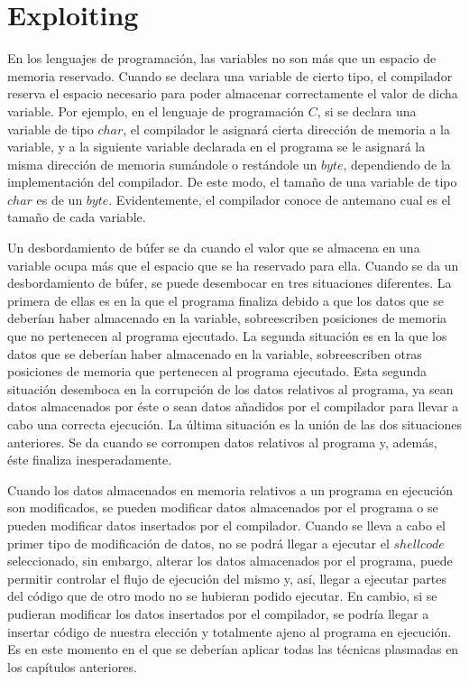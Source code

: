 \documentclass [titlepage, 12pt]{article}
\begin{document}
\pagebreak

\section{Exploiting}

En los lenguajes de programaci\'on, las variables no son m\'as que un espacio de memoria reservado. Cuando se declara una variable de cierto tipo, el compilador reserva el espacio necesario para poder almacenar correctamente el valor de dicha variable. Por ejemplo, en el lenguaje de programaci\'on $C$, si se declara una variable de tipo $char$, el compilador le asignar\'a cierta direcci\'on de memoria a la variable, y a la siguiente variable declarada en el programa se le asignar\'a la misma direcci\'on de memoria sum\'andole o rest\'andole un $byte$, dependiendo de la implementaci\'on del compilador. De este modo, el tama\~no de una variable de tipo $char$ es de un $byte$. Evidentemente, el compilador conoce de antemano cual es el tama\~no de cada variable.\bigskip

Un desbordamiento de b\'ufer se da cuando el valor que se almacena en una variable ocupa m\'as que el espacio que se ha reservado para ella. Cuando se da un desbordamiento de b\'ufer, se puede desembocar en tres situaciones diferentes. La primera de ellas es en la que el programa finaliza debido a que los datos que se deber\'ian haber almacenado en la variable, sobreescriben posiciones de memoria que no pertenecen al programa ejecutado. La segunda situaci\'on es en la que los datos que se deber\'ian haber almacenado en la variable, sobreescriben otras posiciones de memoria que pertenecen al programa ejecutado. Esta segunda situaci\'on desemboca en la corrupci\'on de los datos relativos al programa, ya sean datos almacenados por \'este o sean datos a\~nadidos por el compilador para llevar a cabo una correcta ejecuci\'on. La \'ultima situaci\'on es la uni\'on de las dos situaciones anteriores. Se da cuando se corrompen datos relativos al programa y, adem\'as, \'este finaliza inesperadamente.\bigskip

Cuando los datos almacenados en memoria relativos a un programa en ejecuci\'on son modificados, se pueden modificar datos almacenados por el programa o se pueden modificar datos insertados por el compilador. Cuando se lleva a cabo el primer tipo de modificaci\'on de datos, no se podr\'a llegar a ejecutar el $shellcode$ seleccionado, sin embargo, alterar los datos almacenados por el programa, puede permitir controlar el flujo de ejecuci\'on del mismo y, as\'i, llegar a ejecutar partes del c\'odigo que de otro modo no se hubieran podido ejecutar. En cambio, si se pudieran modificar los datos insertados por el compilador, se podr\'ia llegar a insertar c\'odigo de nuestra elecci\'on y totalmente ajeno al programa en ejecuci\'on. Es en este momento en el que se deber\'ian aplicar todas las t\'ecnicas plasmadas en los cap\'itulos anteriores.\bigskip
\end{document}
